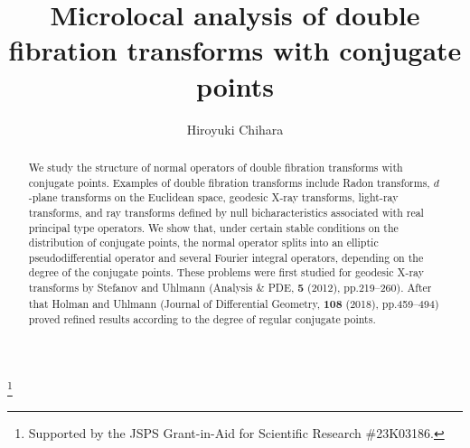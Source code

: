 \documentclass[a4paper,11pt,reqno]{amsart}
\theoremstyle{definition}
\theoremstyle{remark}
\begin{document}
\title[Double fibration transform]{Microlocal analysis of double fibration transforms with conjugate points}
\author[H.~Chihara]{Hiroyuki Chihara}
\address{College of Education, University of the Ryukyus, Nishihara, Okinawa 903-0213, Japan}
\thanks{Supported by the JSPS Grant-in-Aid for Scientific Research \#23K03186.}
\begin{abstract}
We study the structure of normal operators of double fibration transforms with conjugate points. Examples of double fibration transforms include  Radon transforms, $d$-plane transforms on the Euclidean space, geodesic X-ray transforms, light-ray transforms, and ray transforms defined by null bicharacteristics associated with real principal type operators. We show that, under certain stable conditions on the distribution of conjugate points, the normal operator splits into an elliptic pseudodifferential operator and several Fourier integral operators, depending on the degree of the conjugate points. These problems were first studied for geodesic X-ray transforms by Stefanov and Uhlmann (Analysis \& PDE, {\bf 5} (2012), pp.219--260). After that Holman and Uhlmann (Journal of Differential Geometry, {\bf 108} (2018), pp.459--494) proved refined results according to the degree of regular conjugate points.  
\end{abstract}
\maketitle
\end{document}
